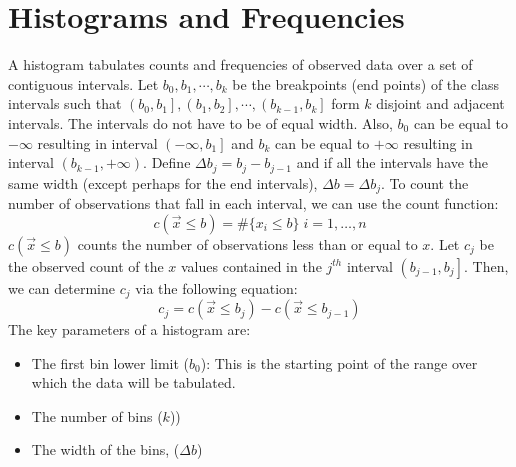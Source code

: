 \documentclass[
]{book}
\providecommand{\tightlist}{%
  \setlength{\itemsep}{0pt}\setlength{\parskip}{0pt}}
\theoremstyle{definition}
\theoremstyle{definition}
\theoremstyle{definition}
\theoremstyle{definition}
\theoremstyle{remark}
\begin{document}
\hypertarget{histograms-and-frequencies}{%
\section{Histograms and Frequencies}\label{histograms-and-frequencies}}

A histogram tabulates counts and frequencies of observed data over a set of contiguous intervals. Let \(b_{0}, b_{1}, \cdots, b_{k}\) be the breakpoints (end points) of the class intervals such that \(\left(b_{0}, b_{1} \right], \left(b_{1}, b_{2} \right], \cdots, \left(b_{k-1}, b_{k} \right]\) form \(k\) disjoint and adjacent intervals. The intervals do not have to be of equal width. Also, \(b_{0}\) can be equal to \(-\infty\) resulting in interval \(\left(-\infty, b_{1} \right]\) and \(b_{k}\) can be equal to \(+\infty\) resulting in interval \(\left(b_{k-1}, +\infty \right)\). Define \(\Delta b_j = b_{j} - b_{j-1}\) and if all the intervals have the same width (except perhaps for the end intervals), \(\Delta b = \Delta b_j\). To count the number of observations that fall in each interval, we can use the count function:
\[
c(\vec{x}\leq b) = \#\lbrace x_i \leq b \rbrace \; i=1,\ldots,n
\]
\(c(\vec{x}\leq b)\) counts the number of observations less than or equal to \(x\). Let \(c_{j}\) be the observed count of the \(x\) values contained in the \(j^{th}\) interval \(\left(b_{j-1}, b_{j} \right]\). Then, we can determine \(c_{j}\) via the following equation:
\[
c_{j} = c(\vec{x}\leq b_{j}) - c(\vec{x}\leq b_{j-1})
\]
The key parameters of a histogram are:

\begin{itemize}
\tightlist
\item
  The first bin lower limit (\(b_{0}\)): This is the starting point of the range over which the data will be tabulated.
\item
  The number of bins (\(k\)))
\item
  The width of the bins, (\(\Delta b\))
\end{itemize}
\end{document}
